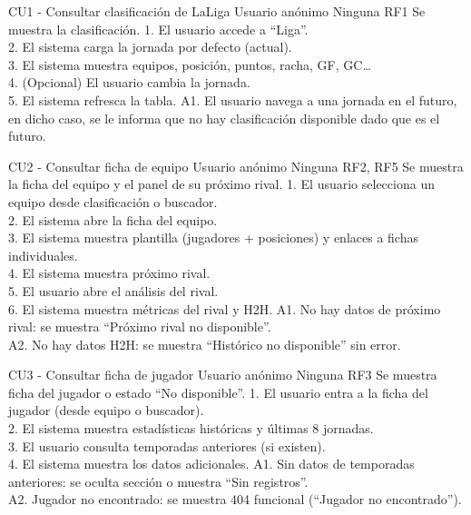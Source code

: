 \CUTable%
{CU1 - Consultar clasificación de LaLiga}
{Usuario anónimo}
{Ninguna}
{RF1}
{Se muestra la clasificación.}
{1. El usuario accede a “Liga”.\\2. El sistema carga la jornada por defecto (actual).\\3. El sistema muestra equipos, posición, puntos, racha, GF, GC…\\4. (Opcional) El usuario cambia la jornada.\\5. El sistema refresca la tabla.}
{A1. El usuario navega a una jornada en el futuro, en dicho caso, se le informa que no hay clasificación disponible dado que es el futuro.}

\CUTable%
{CU2 - Consultar ficha de equipo}
{Usuario anónimo}
{Ninguna}
{RF2, RF5}
{Se muestra la ficha del equipo y el panel de su próximo rival.}
{1. El usuario selecciona un equipo desde clasificación o buscador.\\2. El sistema abre la ficha del equipo.\\3. El sistema muestra plantilla (jugadores + posiciones) y enlaces a fichas individuales.\\4. El sistema muestra próximo rival.\\5. El usuario abre el análisis del rival.\\6. El sistema muestra métricas del rival y H2H.}
{A1. No hay datos de próximo rival: se muestra “Próximo rival no disponible”.\\A2. No hay datos H2H: se muestra “Histórico no disponible” sin error.}

\CUTable%
{CU3 - Consultar ficha de jugador}
{Usuario anónimo}
{Ninguna}
{RF3}
{Se muestra ficha del jugador o estado “No disponible”.}
{1. El usuario entra a la ficha del jugador (desde equipo o buscador).\\2. El sistema muestra estadísticas históricas y últimas 8 jornadas.\\3. El usuario consulta temporadas anteriores (si existen).\\4. El sistema muestra los datos adicionales.}
{A1. Sin datos de temporadas anteriores: se oculta sección o muestra “Sin registros”.\\A2. Jugador no encontrado: se muestra 404 funcional (“Jugador no encontrado”).}

